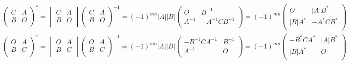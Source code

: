 \documentclass{overview}
\begin{document}
\[
\begin{aligned}
	&
		\begin{pmatrix} C & A \\
		B & O \\ \end{pmatrix}^{*}
	=
	\begin{vmatrix} C & A \\
		B & O \\ \end{vmatrix}
	\begin{pmatrix} C & A \\
	B & O \\ \end{pmatrix}^{-1}
	=(-1)^{mn}|A||B|
	\begin{pmatrix} O & B^{-1} \\
		A^{-1} & -A^{-1}CB^{-1} \\ \end{pmatrix}
	=(-1)^{mn}
	\begin{pmatrix} O & |A|B^{*} \\
		|B|A^{*} & -A^{*}C B^{*} \\ \end{pmatrix} \\
	&
	\begin{pmatrix} O & A \\
	B & C \\ \end{pmatrix}^{*}
	=
	\begin{vmatrix} O & A \\
	B & C \\ \end{vmatrix}
	\begin{pmatrix} O & A \\
	B & C \\ \end{pmatrix}^{-1}
	=(-1)^{mn}|A||B|
	\begin{pmatrix} -B^{-1}CA^{-1} & B^{-1} \\
		A^{-1} & O \\ \end{pmatrix}
	=(-1)^{mn}
	\begin{pmatrix} -B^{*}C A^{*} & |A|B^{*} \\
		|B|A^{*} & O \\ \end{pmatrix}
\end{aligned}
\] 
\end{document}

